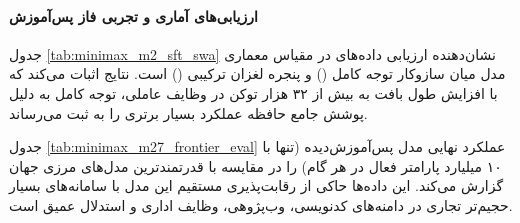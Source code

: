 \paragraph*{ارزیابی‌های آماری و تجربی فاز پس‌آموزش}
جدول \ref{tab:minimax_m2_sft_swa} نشان‌دهنده ارزیابی داده‌های  در مقیاس معماری مدل  میان سازوکار توجه کامل () و پنجره لغزان ترکیبی () است. نتایج اثبات می‌کند که با افزایش طول بافت به بیش از ۳۲ هزار توکن در وظایف عاملی، توجه کامل به دلیل پوشش جامع حافظه عملکرد بسیار برتری را به ثبت می‌رساند.

\begin{table}[htbp]
\centering
\caption{ارزیابی داده‌های  در مقیاس مدل : مقایسه توجه کامل و پنجره لغزان}
\label{tab:minimax_m2_sft_swa}
\end{table}

جدول \ref{tab:minimax_m27_frontier_eval} عملکرد نهایی مدل پس‌آموزش‌دیده  (تنها با ۱۰ میلیارد پارامتر فعال در هر گام) را در مقایسه با قدرتمندترین مدل‌های مرزی جهان گزارش می‌کند. این داده‌ها حاکی از رقابت‌پذیری مستقیم این مدل با سامانه‌های بسیار حجیم‌تر تجاری در دامنه‌های کدنویسی، وب‌پژوهی، وظایف اداری و استدلال عمیق است.

